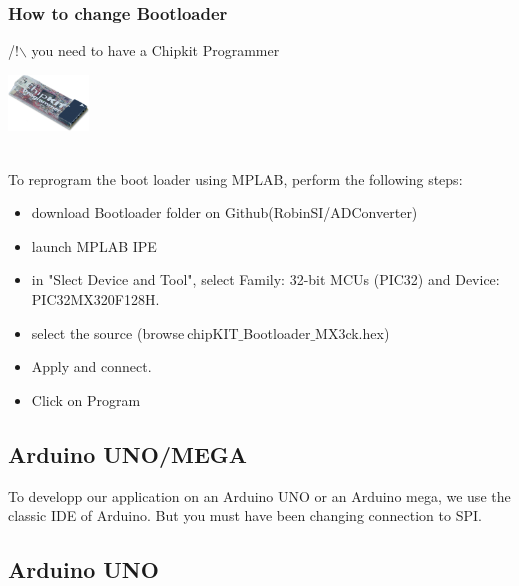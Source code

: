\documentclass[10pt,a4paper]{report}
\begin{document}
\subsubsection*{How to change Bootloader}

/!$\backslash$ you need to have a Chipkit Programmer
\begin{minipage}[c]{0.1\linewidth}
    \centering \includegraphics[height=1.5cm,keepaspectratio=true]{chipkitprogrammer}
\end{minipage}\hfill 
\\ To reprogram the boot loader using MPLAB,
perform the following steps: \\


\begin{itemize}
\item download Bootloader folder on Github(RobinSI/ADConverter)
\item launch MPLAB IPE
\item in "Slect Device and Tool", select Family: 32-bit MCUs (PIC32) and Device: PIC32MX320F128H.
\item select the source (browse$\ $chipKIT$\_$Bootloader$\_$MX3ck.hex)
\item Apply and connect.
\item Click on Program
\end{itemize}
\subsection{Arduino UNO/MEGA}
To developp our application on an Arduino UNO or an Arduino mega, we use the classic IDE of Arduino. But you must have been changing connection to SPI.

\subsection*{Arduino UNO}
\end{document}
